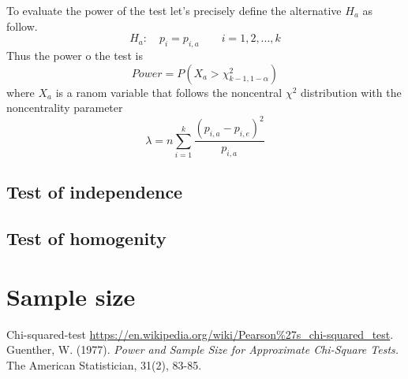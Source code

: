 \documentclass{article}
\begin{document}
To evaluate the power of the test let's precisely define the alternative $H_a$ as follow.
\begin{equation}
    H_a: \quad p_i=p_{i,a} \qquad i =1,2,...,k
\end{equation}
Thus the power o the test is
\begin{equation}
    Power = P\left(X_a > \chi^2_{k-1,1-\alpha}\right)
\end{equation}
where $X_a$ is a ranom variable that follows the noncentral $\chi^2$ distribution with the noncentrality parameter
\begin{equation}
    \lambda = n \sum_{i=1}^k \frac{\left(p_{i,a}-p_{i,e}\right)^2}{p_{i,a}}
\end{equation}





\subsection{Test of independence}

\subsection{Test of homogenity}

\section{Sample size}


\begin{thebibliography}{9}
    Chi-squared-test 
    \url{https://en.wikipedia.org/wiki/Pearson\%27s\_chi-squared\_test}.
    Guenther, W. (1977). 
    \textit{Power and Sample Size for Approximate Chi-Square Tests.} 
    The American Statistician, 31(2), 83-85.

\end{thebibliography}   
\end{document}
